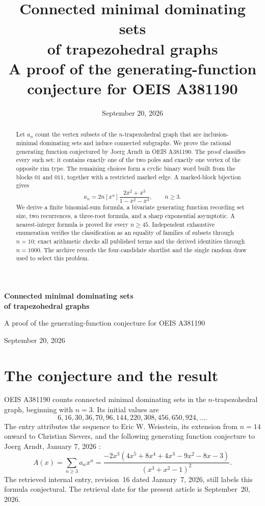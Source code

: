 \documentclass[11pt,letterpaper]{article}
\title{\vspace{-1.5em}\textbf{Connected minimal dominating sets\\of trapezohedral graphs}\\[0.55em]
\large A proof of the generating-function conjecture for OEIS A381190}
\author{}
\date{September 20, 2026}
\numberwithin{equation}{section}
\theoremstyle{definition}
\theoremstyle{remark}
\newcommand{\coeff}[2]{[#1^{#2}]}
\begin{document}
\thispagestyle{plain}
\begin{center}
{\LARGE\bfseries Connected minimal dominating sets\\[0.2em]
of trapezohedral graphs\par}
\vspace{0.7em}
{\large A proof of the generating-function conjecture for OEIS A381190\par}
\vspace{0.7em}
September 20, 2026
\end{center}
\vspace{0.1em}
\begin{abstract}
Let $a_n$ count the vertex subsets of the $n$-trapezohedral graph that are
inclusion-minimal dominating sets and induce connected subgraphs. We prove
the rational generating function conjectured by Joerg Arndt in OEIS A381190.
The proof classifies every such set: it contains exactly one of the two
poles and exactly one vertex of the opposite rim type. The remaining
choices form a cyclic binary word built from the blocks $01$ and $011$,
together with a restricted marked edge. A marked-block bijection gives
\[
 a_n=2n\coeff{x}{n}\frac{2x^2+x^3}{1-x^2-x^3},\qquad n\ge3.
\]
We derive a finite binomial-sum formula, a bivariate generating function
recording set size, two recurrences, a three-root formula, and a sharp
exponential asymptotic. A nearest-integer formula is proved for every
$n\ge45$. Independent exhaustive enumeration verifies the classification
as an equality of families of subsets through $n=10$; exact arithmetic
checks all published terms and the derived identities through $n=1000$.
The archive records the four-candidate shortlist and the single random
draw used to select this problem.
\end{abstract}
\setcounter{tocdepth}{1}
\tableofcontents
\newpage

\section{The conjecture and the result}

OEIS A381190 counts connected minimal dominating sets in the
$n$-trapezohedral graph, beginning with $n=3$. Its initial values are
\begin{equation}\label{eq:initial}
6,16,30,36,70,96,144,220,308,456,650,924,\ldots.
\end{equation}
The entry attributes the sequence to Eric W. Weisstein, its extension
from $n=14$ onward to Christian Sievers, and the following generating
function conjecture to Joerg Arndt, January 7, 2026 \cite{oeis381190}:
\begin{equation}\label{eq:conjecture}
 A(x)=\sum_{n\ge3}a_nx^n
 =\frac{-2x^3(4x^5+8x^4+4x^3-9x^2-8x-3)}{(x^3+x^2-1)^2}.
\end{equation}
The retrieved internal entry, revision~16 dated January~7, 2026, still
labels this formula conjectural. The retrieval date for the present
article is September~20, 2026.
\end{document}
